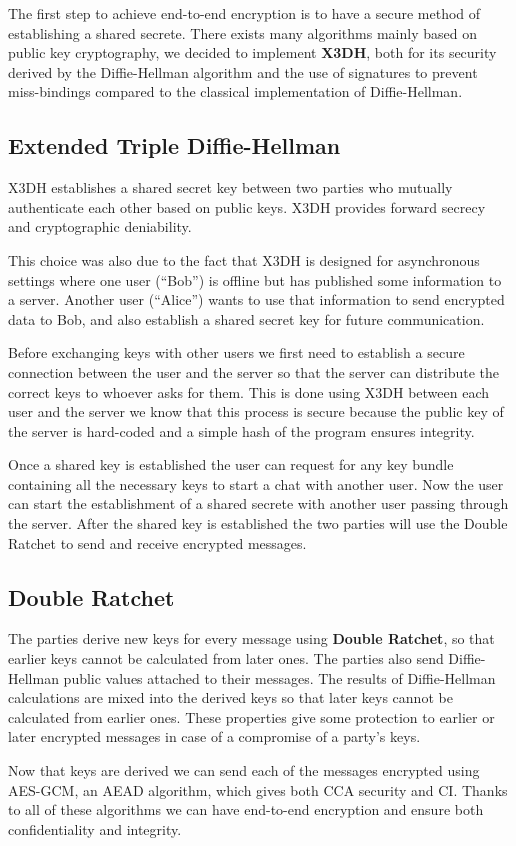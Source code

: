 The first step to achieve end-to-end encryption is to have a secure method of establishing a shared secrete. There exists many algorithms mainly based on public key cryptography, we decided to implement \textbf{X3DH}, both for its security derived by the Diffie-Hellman algorithm and the use of signatures to prevent miss-bindings compared to the classical implementation of Diffie-Hellman.

\subsection {Extended Triple Diffie-Hellman}
\label{subsec:ExtendedTripleDiffieHellman}

X3DH establishes a shared secret key between two parties who mutually authenticate each other based on public keys. X3DH provides forward secrecy and cryptographic deniability.

This choice was also due to the fact that X3DH is designed for asynchronous settings where one user (“Bob”) is offline but has published some information to a server. Another user (“Alice”) wants to use that information to send encrypted data to Bob, and also establish a shared secret key for future communication.

Before exchanging keys with other users we first need to establish a secure connection between the user and the server so that the server can distribute the correct keys to whoever asks for them. This is done using X3DH between each user and the server we know that this process is secure because the public key of the server is hard-coded and a simple hash of the program ensures integrity.

Once a shared key is established the user can request for any key bundle containing all the necessary keys to start a chat with another user. Now the user can start the establishment of a shared secrete with another user passing through the server. After the shared key is established the two parties will use the Double Ratchet to send and receive encrypted messages.

\subsection{Double Ratchet}
\label{subsec:DoubleRachet}

The parties derive new keys for every message using \textbf{Double Ratchet}, so that earlier keys cannot be calculated from later ones. The parties also send Diffie-Hellman public values attached to their messages. The results of Diffie-Hellman calculations are mixed into the derived keys so that later keys cannot be calculated from earlier ones. These properties give some protection to earlier or later encrypted messages in case of a compromise of a party’s keys.

Now that keys are derived we can send each of the messages encrypted using AES-GCM, an AEAD algorithm, which gives both CCA security and CI. Thanks to all of these algorithms we can have end-to-end encryption and ensure both confidentiality and integrity.
